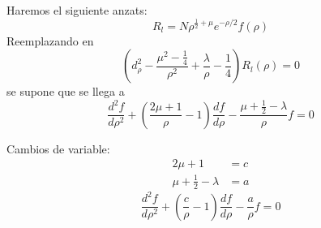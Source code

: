 Haremos el siguiente anzats:
\begin{equation}
R_{l}=N\rho^{\frac{1}{2}+\mu}e^{-\rho/2}f\left(  \rho\right)
\end{equation}
Reemplazando en
\begin{equation}
\left(  d_{\rho}^{2}-\frac{\mu^{2}-\frac{1}{4}}{\rho^{2}}+\frac{\lambda}{\rho
}-\frac{1}{4}\right)  R_{l}\left(  \rho\right)  =0
\end{equation}
se supone que se llega a
\begin{equation}
\frac{d^{2}f}{d\rho^{2}}+\left(  \frac{2\mu+1}{\rho}-1\right)  \frac{df}%
{d\rho}-\frac{\mu+\frac{1}{2}-\lambda}{\rho}f=0
\end{equation}


Cambios de variable:
\begin{align*}
2\mu+1  & =c\\
\mu+\frac{1}{2}-\lambda & =a
\end{align*}
\begin{equation}
\frac{d^{2}f}{d\rho^{2}}+\left(  \frac{c}{\rho}-1\right)  \frac{df}{d\rho
}-\frac{a}{\rho}f=0
\end{equation}


